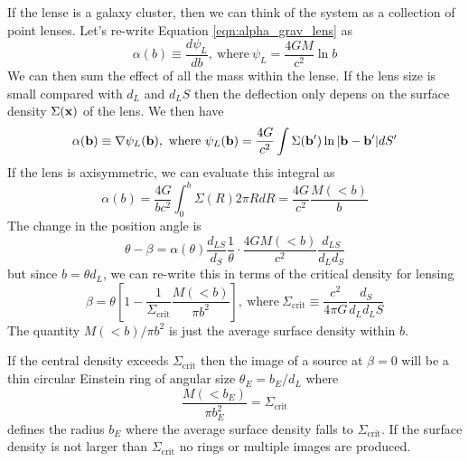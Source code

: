 \documentclass[]{article}
\begin{document}
If the lense is a galaxy cluster, then we can
think of the system as a collection of point lenses.
Let's re-write Equation \ref{eqn:alpha_grav_lens} as
\begin{equation}
\alpha(b) \equiv \frac{d \psi_L}{db},~\mathrm{where}~\psi_L = \frac{4 GM}{c^2}\ln b
\end{equation}
\noindent
We can then sum the effect of all the mass within the lense.
If the lens size is small compared with $d_L$ and $d_LS$ then
the deflection only depens on the surface density $\Sigma(\mathbf{x})$
of the lens.  We then have
\begin{equation}
\alpha(\mathbf{b}) \equiv \nabla \psi_L(\mathbf{b}),~\mathrm{where}~\psi_L(\mathbf{b}) = \frac{4G}{c^2}\int \Sigma(\mathbf{b}') \ln |\mathbf{b} - \mathbf{b}'| dS'
\end{equation}
\noindent
If the lens is axisymmetric, we can evaluate this integral as
\begin{equation}
\alpha(b) = \frac{4G}{bc^2}\int_{0}^{b} \Sigma(R) 2 \pi R dR = \frac{4G}{c^2} \frac{M(<b)}{b}
\end{equation}
\noindent
The change in the position angle is
\begin{equation}
\theta - \beta = \alpha(\theta)\frac{d_{LS}}{d_S} \frac{1}{\theta} \cdot \frac{4GM(<b)}{c^2}\frac{d_{LS}}{d_L d_S}
\end{equation}
\noindent
but since $b = \theta d_L$, we can re-write this in terms of the critical density for lensing
\begin{equation}
\beta = \theta\left[1 - \frac{1}{\Sigma_{\mathrm{crit}}}\frac{M(<b)}{\pi b^2}\right],~\mathrm{where}~\Sigma_{\mathrm{crit}} \equiv \frac{c^2}{4\pi G}\frac{d_S}{d_L d_LS}
\end{equation}
\noindent
The quantity $M(<b)/\pi b^2$ is just the average surface density within $b$.

If the central density exceeds $\Sigma_{\mathrm{crit}}$ then the image of a
source at $\beta=0$ will be a thin circular Einstein ring of angular size $\theta_{E} = b_E/d_L$
where
\begin{equation}
\frac{M(<b_E)}{\pi b_E^2} = \Sigma_{\mathrm{crit}}
\end{equation}
defines the radius $b_E$ where the average surface density falls to $\Sigma_{\mathrm{crit}}$. If
the surface density is not larger than $\Sigma_\mathrm{crit}$ no rings or multiple images are produced.
\end{document}

